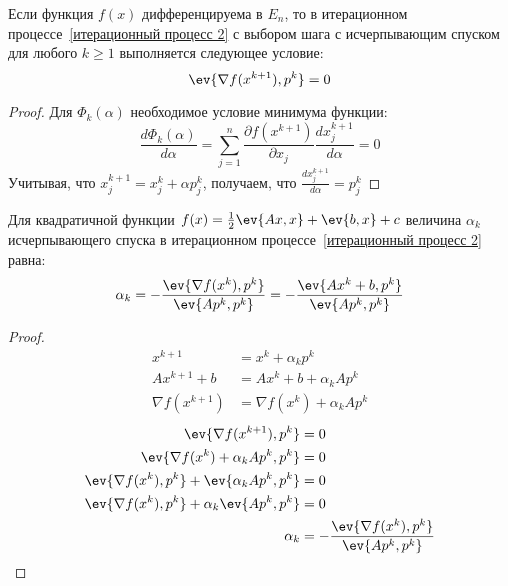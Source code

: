 \begin{theorem}
    Если функция \(f(x)\) дифференцируема в \(E_n\), то в итерационном процессе~\eqref{итерационный процесс 2} с выбором шага с исчерпывающим спуском для любого \(k \geq 1\) выполняется следующее условие:
    \begin{equation}
        \ev{\nabla f(x^{k + 1}), p^k} = 0
        \label{условие при процессе}
    \end{equation}
\end{theorem}
\begin{proof} %
    Для \(\Phi_k(\alpha)\) необходимое условие минимума функции:
    \[\frac{d \Phi_k(\alpha)}{d \alpha} = \sum_{j = 1}^n \frac{\partial f(x^{k + 1})}{\partial x_j} \frac{d x_j^{k + 1}}{d \alpha} = 0\]
    Учитывая, что \(x^{k + 1}_j = x_j^k + \alpha p_j^k\), получаем, что \(\frac{d x_j^{k + 1}}{d \alpha} = p_j^k\)
\end{proof}

\begin{theorem}
    Для квадратичной функции \(f(x) = \frac{1}{2} \ev{Ax, x} + \ev{b, x} + c\) величина \(\alpha_k\) исчерпывающего спуска в итерационном процессе~\eqref{итерационный процесс 2} равна:
    \begin{equation}
        \alpha_k = - \frac{\ev{\nabla f(x^k), p^k}}{\ev{A p^k, p^k}} = - \frac{\ev{Ax^k + b, p^k}}{\ev{Ap^k, p^k}}
        \label{alpha k в исчерпывающем спуске}
    \end{equation}
\end{theorem}
\begin{proof}
    \begin{align*}
        x^{k + 1}           & = x^k + \alpha_k p^k             \\
        Ax^{k + 1} + b      & = Ax^k + b + \alpha_k A p^k      \\
        \nabla f(x^{k + 1}) & = \nabla f(x^k) + \alpha_k A p^k
    \end{align*}
    \begin{align*}
        \ev{\nabla f(x^{k + 1}), p^k}                      & = 0                                                 \\
        \ev{\nabla f(x^k) + \alpha_k A p^k, p^k}           & = 0                                                 \\
        \ev{\nabla f(x^k), p^k} + \ev{\alpha_k A p^k, p^k} & = 0                                                 \\
        \ev{\nabla f(x^k), p^k} + \alpha_k \ev{A p^k, p^k} & = 0                                                 \\
        \alpha_k                                           & = - \frac{\ev{\nabla f(x^k), p^k}}{\ev{A p^k, p^k}}
    \end{align*}
\end{proof}
